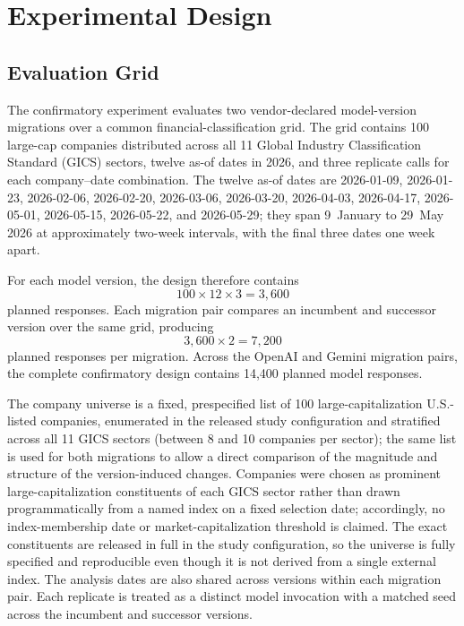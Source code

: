 \documentclass{ieeeaccess}
\begin{document}
\section{Experimental Design}
\subsection{Evaluation Grid}
The confirmatory experiment evaluates two vendor-declared model-version migrations over a common financial-classification grid. The grid contains 100 large-cap companies distributed across all 11 Global Industry Classification Standard (GICS) sectors, twelve as-of dates in 2026, and three replicate calls for each company--date combination. The twelve as-of dates are 2026-01-09, 2026-01-23, 2026-02-06, 2026-02-20, 2026-03-06, 2026-03-20, 2026-04-03, 2026-04-17, 2026-05-01, 2026-05-15, 2026-05-22, and 2026-05-29; they span 9~January to 29~May 2026 at approximately two-week intervals, with the final three dates one week apart.

For each model version, the design therefore contains
\begin{equation}
100 \times 12 \times 3 = 3{,}600
\end{equation}
planned responses. Each migration pair compares an incumbent and successor version over the same grid, producing
\begin{equation}
3{,}600 \times 2 = 7{,}200
\end{equation}
planned responses per migration. Across the OpenAI and Gemini migration pairs, the complete confirmatory design contains 14{,}400 planned model responses.

The company universe is a fixed, prespecified list of 100 large-capitalization U.S.-listed companies, enumerated in the released study configuration and stratified across all 11 GICS sectors (between 8 and 10 companies per sector); the same list is used for both migrations to allow a direct comparison of the magnitude and structure of the version-induced changes. Companies were chosen as prominent large-capitalization constituents of each GICS sector rather than drawn programmatically from a named index on a fixed selection date; accordingly, no index-membership date or market-capitalization threshold is claimed. The exact constituents are released in full in the study configuration, so the universe is fully specified and reproducible even though it is not derived from a single external index. The analysis dates are also shared across versions within each migration pair. Each replicate is treated as a distinct model invocation with a matched seed across the incumbent and successor versions.
\end{document}
